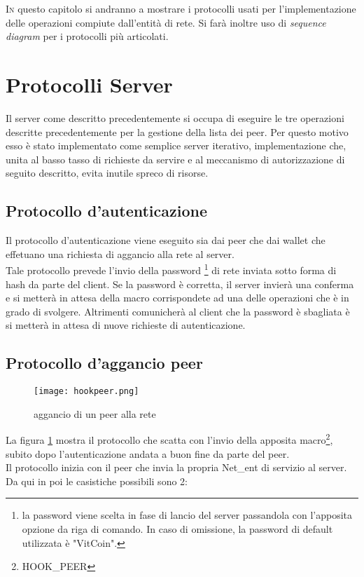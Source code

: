\lettrine{I}{n} questo capitolo si andranno a mostrare i protocolli usati per l'implementazione delle operazioni compiute dall'entità di rete. Si farà inoltre uso di \textit{sequence diagram} per i protocolli più articolati.

\section{Protocolli Server}
Il server come descritto precedentemente si occupa di eseguire le tre operazioni descritte precedentemente per la gestione della lista dei peer. Per questo motivo esso è stato implementato come semplice server iterativo, implementazione che, unita al basso tasso di richieste da servire e al meccanismo di autorizzazione di seguito descritto, evita inutile spreco di risorse.

\subsection{Protocollo d'autenticazione}
Il protocollo d'autenticazione viene eseguito sia dai peer che dai wallet che effetuano una richiesta di aggancio alla rete al server.\\ Tale protocollo prevede l'invio della password \footnote{la password viene scelta in fase di lancio del server passandola con l'apposita opzione da riga di comando. In caso di omissione, la password di default utilizzata è "VitCoin".} di rete inviata sotto forma di hash da parte del client. Se la password è corretta, il server invierà una conferma e si metterà in attesa della macro corrispondete ad una delle operazioni che è in grado di svolgere. Altrimenti comunicherà al client che la password è sbagliata è si metterà in attesa di nuove richieste di autenticazione.

\subsection{Protocollo d'aggancio peer}
\begin{figure}[H]
  \centering
  \texttt{[image: hookpeer.png]}    
  \caption{aggancio di un peer alla rete}
  \label{fig:hook_peer}
\end{figure}

La figura \ref{fig:hook_peer} mostra il protocollo che scatta con l'invio della apposita macro\footnote{HOOK\_PEER}, subito dopo l'autenticazione andata a buon fine da parte del peer. \\Il protocollo inizia con il peer che invia la propria Net\_ent di servizio al server. Da qui in poi le casistiche possibili sono 2:

